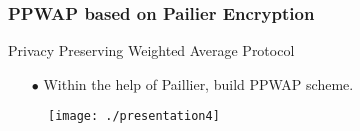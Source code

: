 \documentclass[xcolor=table]{beamer}
\begin{document}
\begin{frame}
\frametitle{PPWAP based on Pailier Encryption}
Privacy Preserving Weighted Average Protocol
\begin{itemize} \itemsep20pt \parskip0pt 
  \item[$\bullet$] Within the help of Paillier, build PPWAP scheme. 
\end{itemize}
\vspace{4 mm}

\begin{figure}[H]
  \centering
  \texttt{[image: ./presentation4]}
\end{figure}



\end{frame}
\end{document}
